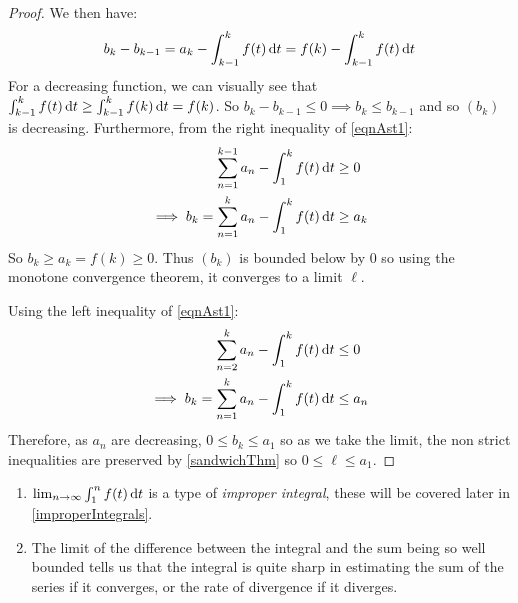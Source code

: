 \documentclass[../main.tex]{subfiles}
\begin{document}
\begin{proof}
  We then have:
  \[
    b_k - b_{k - 1} = a_k - \int_{k - 1}^{k} f(t) \d{t} = f(k) - \int_{k - 1}^{k} f(t) \d{t}
  \]
  For a decreasing function, we can visually see that $\int_{k - 1}^{k} f(t) \d{t} \geq \int_{k-1}^{k} f(k) \d{t} = f(k)$.
  So $b_k - b_{k - 1} \leq 0 \implies b_k \leq b_{k - 1}$ and so $(b_k)$ is decreasing.
  Furthermore, from the right inequality of \cref{eqnAst1}:
  \begin{align*}
    \sum_{n = 1}^{k - 1} a_n - \int_{1}^{k} f(t) \d{t} &\geq 0 \\
    \implies b_k = \sum_{n = 1}^{k} a_n - \int_{1}^{k} f(t) \d{t} &\geq a_k
  \end{align*}
  So $b_k \geq a_k = f(k) \geq 0$.
  Thus $(b_k)$ is bounded below by 0 so using the monotone convergence theorem, it converges to a limit $\ell$.

  Using the left inequality of \cref{eqnAst1}:
  \begin{align*}
    \sum_{n = 2}^{k} a_n - \int_{1}^{k} f(t) \d{t} &\leq 0 \\
    \implies b_k = \sum_{n = 1}^{k} a_n - \int_{1}^{k} f(t) \d{t} &\leq a_n
  \end{align*}
  Therefore, as $a_n$ are decreasing, $0 \leq b_k \leq a_1$ so as we take the limit, the non strict inequalities are preserved by \cref{sandwichThm} so $0 \leq \ell \leq a_1$.
\end{proof}
\begin{remark}
  \begin{enumerate}
    \item $\lim_{n \to \infty} \int_{1}^{n} f(t) \d{t}$ is a type of \textit{improper integral}, these will be covered later in \cref{improperIntegrals}.
    \item The limit of the difference between the integral and the sum being so well bounded tells us that the integral is quite sharp in estimating the sum of the series if it converges, or the rate of divergence if it diverges.
  \end{enumerate}
\end{remark}
\end{document}
